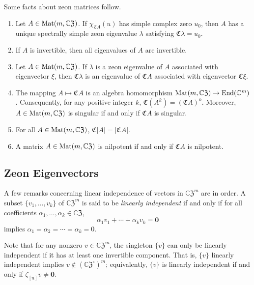 \documentclass{article}
\theoremstyle{definition}
\newcommand{\zco}{\mathfrak{C}\mspace{1mu}}
\newcommand{\CZ}{\mathbb{C}\mathfrak{Z}}
\newcommand{\Mat}{{\rm Mat}}
\newcommand{\zm}{\mathbf{0}}
\numberwithin{equation}{section}
\begin{document}
Some facts about zeon matrices follow.
\begin{enumerate}
\item Let $A\in \Mat(m,\CZ)$.  If $\chi_{\zco A}(u)$ has simple complex zero $u_0$, then $A$ has a unique spectrally simple zeon eigenvalue $\lambda$ satisfying $\zco \lambda = u_0$.

\item If $A$ is invertible, then all eigenvalues of $A$ are invertible.

\item Let $A\in\Mat(m,\CZ)$.  If $\lambda$ is a zeon eigenvalue of $A$ associated with eigenvector $\xi$,  then $\zco \lambda$ is an eigenvalue of $\zco A$ associated with eigenvector $\zco \xi$.

\item The mapping $A\mapsto \zco A$ is an algebra homomorphism  \break $\Mat(m,\CZ)\to {\rm End}(\mathbb{C}^m)$.  Consequently, for any positive integer $k$, $\zco(A^k)=(\zco A)^k$.   Moreover, $A\in\Mat(m,\CZ)$ is singular if and only if $\zco A$ is singular.    


\item For all $A\in\Mat(m,\CZ)$,  $\zco |A| = |\zco A|$. 

\item A matrix $A \in\Mat(m,\CZ)$ is nilpotent if and only if $\zco A$ is nilpotent.

\end{enumerate}



\subsection*{Zeon Eigenvectors}

A few remarks concerning linear independence of vectors in ${\CZ}^m$ are in order.  A subset $\{v_1, \ldots, v_k\}$ of ${\CZ}^m$ is said to be {\em linearly independent} if and only if for all coefficients $\alpha_1, \ldots, \alpha_k\in\CZ$, 
\begin{equation*}
\alpha_1v_1+\cdots+\alpha_kv_k=\zm
\end{equation*} 
implies $\alpha_1=\alpha_2=\cdots=\alpha_k=0$.

Note that for any nonzero $v\in {\CZ}^m$, the singleton $\{v\}$ can only be linearly independent if it has at least one invertible component.  That is, $\{v\}$ linearly independent implies $v\notin ({\CZ}^\circ)^m$; equivalently, $\{v\}$ is linearly independent if and only if $\zeta_{[n]}v\ne \zm$.
\end{document}
